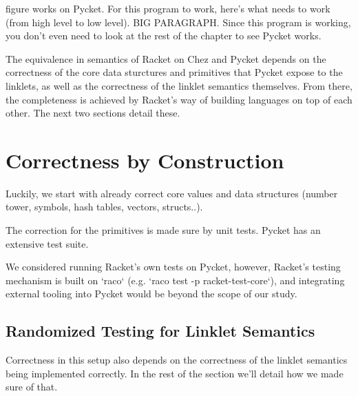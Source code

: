 	\begin{paragraph-here}%
		figure works on Pycket. For this program to work, here's what needs to work (from high level to low level). BIG PARAGRAPH. Since this program is working, you don't even need to look at the rest of the chapter to see Pycket works.
	\end{paragraph-here}

	\begin{paragraph-here}%
		The equivalence in semantics of Racket on Chez and Pycket depends on the correctness of the core data sturctures and primitives that Pycket expose to the linklets, as well as the correctness of the linklet semantics themselves. From there, the completeness is achieved by Racket's way of building languages on top of each other. The next two sections detail these.
	\end{paragraph-here}

	\section[\texorpdfstring{Correctness by Construction}{Correctness}]{Correctness by Construction}

		\begin{paragraph-here}%
			Luckily, we start with already correct core values and data structures (number tower, symbols, hash tables, vectors, structs..).
		\end{paragraph-here}

		\begin{paragraph-here}%
			The correction for the primitives is made sure by unit tests. Pycket has an extensive test suite.
		\end{paragraph-here}


		\begin{paragraph-here}%
			We considered running Racket's own tests on Pycket, however, Racket's testing mechanism is built on `raco` (e.g. `raco test -p racket-test-core`), and integrating external tooling into Pycket would be beyond the scope of our study.
		\end{paragraph-here}

		\subsection{Randomized Testing for Linklet Semantics}
			\begin{paragraph-here}%
				Correctness in this setup also depends on the correctness of the linklet semantics being implemented correctly. In the rest of the section we'll detail how we made sure of that.
			\end{paragraph-here}


